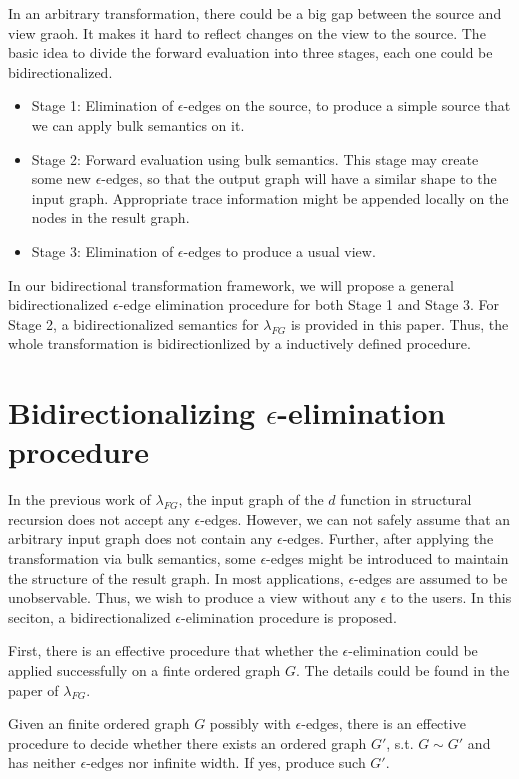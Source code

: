 \documentclass{llncs}
\begin{document}
In an arbitrary transformation, there could be a big gap between the source and view graoh. It makes it hard to reflect changes on the view to the source. The basic idea to divide the forward evaluation into three stages, each one could be bidirectionalized.
\begin{itemize}
	\item Stage 1: Elimination of $\epsilon$-edges on the source, to produce a simple source that we can apply bulk semantics on it.
	\item Stage 2: Forward evaluation using bulk semantics. This stage may create some new $\epsilon$-edges, so that the output graph will have a similar shape to the input graph. Appropriate trace information might be appended locally on the nodes in the result graph.
	\item Stage 3: Elimination of $\epsilon$-edges to produce a usual view.
\end{itemize}

In our bidirectional transformation framework, we will propose a general bidirectionalized $\epsilon$-edge elimination procedure for both Stage 1 and Stage 3. For Stage 2, a bidirectionalized semantics for $\lambda_{FG}$ is provided in this paper. Thus, the whole transformation is bidirectionlized by a inductively defined procedure.

\section{Bidirectionalizing $\epsilon$-elimination procedure}\label{sec-eps}

In the previous work of $\lambda_{FG}$, the input graph of the $d$ function in structural recursion does not accept any $\epsilon$-edges. However, we can not safely assume that an arbitrary input graph does not contain any $\epsilon$-edges. Further, after applying the transformation via bulk semantics, some $\epsilon$-edges might be introduced to maintain the structure of the result graph. In most applications, $\epsilon$-edges are assumed to be unobservable. Thus, we wish to produce a view without any $\epsilon$ to the users. In this seciton, a bidirectionalized $\epsilon$-elimination procedure is proposed. 

First, there is an effective procedure that whether the $\epsilon$-elimination could be applied successfully on a finte ordered graph $G$. The details could be found in the paper of $\lambda_{FG}$.

\begin{lemma}
Given an finite ordered graph $G$ possibly with $\epsilon$-edges, there is an effective procedure to decide whether there exists an ordered graph $G'$, s.t. $G\sim G'$ and has neither $\epsilon$-edges nor infinite width. If yes, produce such $G'$.
\end{lemma}
\end{document}
